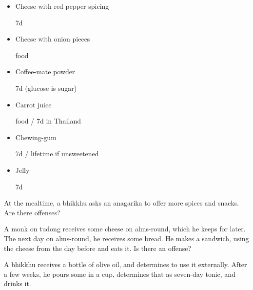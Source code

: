\begin{multicols}{2}
\begin{itemize}
\columnbreak

\item Cheese with red pepper spicing

\begin{solution}
  7d
\end{solution}

\item Cheese with onion pieces

\begin{solution}
  food
\end{solution}

\item Coffee-mate powder

\begin{solution}
  7d (glucose is sugar)
\end{solution}

\item Carrot juice

\begin{solution}
  food / 7d in Thailand
\end{solution}

\item Chewing-gum

\begin{solution}
  7d / lifetime if unsweetened
\end{solution}

\item Jelly

\begin{solution}
  7d
\end{solution}

\end{itemize}

\end{multicols}

\bigskip

At the mealtime, a bhikkhu asks an anagarika to offer more spices and snacks.
Are there offenses?

\bigskip

A monk on tudong receives some cheese on alms-round, which he keeps for later.
The next day on alms-round, he receives some bread. He makes a sandwich, using
the cheese from the day before and eats it. Is there an offense?

\bigskip

A bhikkhu receives a bottle of olive oil, and determines to use it externally.
After a few weeks, he pours some in a cup, determines that as seven-day tonic,
and drinks it.

